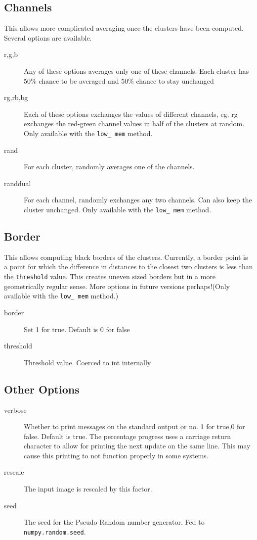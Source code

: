 \documentclass[15pt]{article}
\begin{document}
\subsection{Channels}
This allows more complicated averaging once the clusters have been computed. Several options are available.
\begin{description}
\item [r,g,b] Any of these options averages only one of these channels. Each cluster has 50\% chance to be averaged and 50\% chance to stay unchanged
\item [rg,rb,bg] Each of these options exchanges the values of different channels, eg. rg exchanges the red-green channel values in half of the clusters at random. Only available with the \texttt{low\_ mem} method.
\item [rand] For each cluster, randomly averages one of the channels.
\item [randdual] For each channel, randomly exchanges any two channels. Can also keep the cluster unchanged. Only available with the \texttt{low\_ mem} method.
\end{description}
\subsection{Border}
This allows computing black borders of the clusters. Currently, a border point is a point for which the difference in distances to the closest two clusters is less than the \texttt{threshold} value. This creates uneven sized borders but in a more geometrically regular sense. More options in future versions perhaps!(Only available with the \texttt{low\_ mem} method.)
\begin{description}
\item[border] Set 1 for true. Default is 0 for false
\item[threshold] Threshold value. Coerced to int internally
\end{description}
\subsection{Other Options}
\begin{description}
\item[verbose] Whether to print messages on the standard output or no. 1 for true,0 for false. Default is true. The percentage progress uses a carriage return character to allow for printing the next update on the same line. This may cause this printing to not function properly in some systems.
\item[rescale] The input image is rescaled by this factor.
\item[seed] The seed for the Pseudo Random number generator. Fed to \texttt{numpy.random.seed}. 
\end{description}
\newpage
\end{document}
